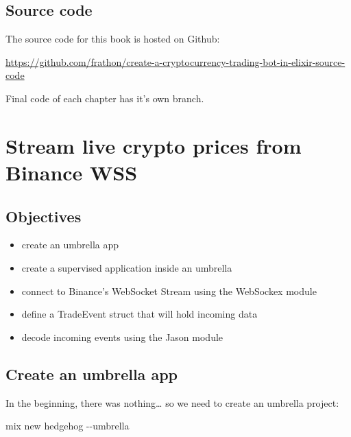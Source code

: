 \documentclass[
]{book}
\newenvironment{Shaded}{\begin{snugshade}}{\end{snugshade}}
\newcommand{\AttributeTok}[1]{\textcolor[rgb]{0.77,0.63,0.00}{#1}}
\newcommand{\ExtensionTok}[1]{#1}
\newcommand{\NormalTok}[1]{#1}
\providecommand{\tightlist}{%
  \setlength{\itemsep}{0pt}\setlength{\parskip}{0pt}}
\begin{document}
\hypertarget{source-code}{%
\section*{Source code}\label{source-code}}

The source code for this book is hosted on Github:

\url{https://github.com/frathon/create-a-cryptocurrency-trading-bot-in-elixir-source-code}

Final code of each chapter has it's own branch.

\hypertarget{stream-live-crypto-prices-from-binance-wss}{%
\chapter{Stream live crypto prices from Binance WSS}\label{stream-live-crypto-prices-from-binance-wss}}

\hypertarget{objectives}{%
\section{Objectives}\label{objectives}}

\begin{itemize}
\tightlist
\item
  create an umbrella app
\item
  create a supervised application inside an umbrella
\item
  connect to Binance's WebSocket Stream using the WebSockex module
\item
  define a TradeEvent struct that will hold incoming data
\item
  decode incoming events using the Jason module
\end{itemize}

\hypertarget{create-an-umbrella-app}{%
\section{Create an umbrella app}\label{create-an-umbrella-app}}

In the beginning, there was nothing\ldots{} so we need to create an umbrella project:

\begin{Shaded}
\begin{Highlighting}[]
\ExtensionTok{mix}\NormalTok{ new hedgehog }\AttributeTok{{-}{-}umbrella}
\end{Highlighting}
\end{Shaded}
\end{document}
